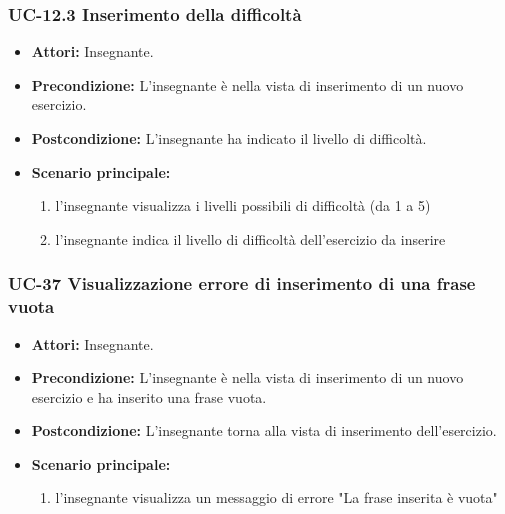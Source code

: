 \subsubsection{UC-12.3 Inserimento della difficoltà}
\begin{itemize}
	\item \textbf{Attori: }Insegnante.
	\item \textbf{Precondizione:} L'insegnante è nella vista di inserimento di un nuovo esercizio.
	\item \textbf{Postcondizione:} L'insegnante ha indicato il livello di difficoltà.
	\item \textbf{Scenario principale:}
	\begin{enumerate}
		\item l'insegnante visualizza i livelli possibili di difficoltà (da 1 a 5)
		\item l'insegnante indica il livello di difficoltà dell'esercizio da inserire
	\end{enumerate}
\end{itemize}

\subsubsection{UC-37 Visualizzazione errore di inserimento di una frase vuota}
\begin{itemize}
	\item \textbf{Attori:} Insegnante.
	\item \textbf{Precondizione:} L'insegnante è nella vista di inserimento di un nuovo esercizio e ha inserito una frase vuota.
	\item \textbf{Postcondizione:} L'insegnante torna alla vista di inserimento dell'esercizio.
	\item \textbf{Scenario principale:}
	\begin{enumerate}
		\item l'insegnante visualizza un messaggio di errore "La frase inserita è vuota"
	\end{enumerate}
\end{itemize}

